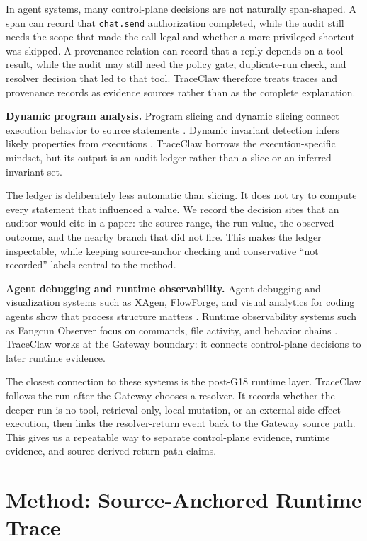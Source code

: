 \documentclass[11pt,a4paper]{article}
\begin{document}
In agent systems, many control-plane decisions are not naturally
span-shaped. A span can record that \texttt{chat.send} authorization
completed, while the audit still needs the scope that made the call legal
and whether a more privileged shortcut was skipped. A provenance relation
can record that a reply depends on a tool result, while the audit may
still need the policy gate, duplicate-run check, and resolver decision
that led to that tool. TraceClaw therefore treats traces and provenance
records as evidence sources rather than as the complete explanation.

\textbf{Dynamic program analysis.}
Program slicing and dynamic slicing connect execution behavior to source
statements \cite{weiser1984,agrawalHorgan1990}. Dynamic invariant
detection infers likely properties from executions \cite{daikon2007}.
TraceClaw borrows the execution-specific mindset, but its output is an
audit ledger rather than a slice or an inferred invariant set.

The ledger is deliberately less automatic than slicing. It does not try
to compute every statement that influenced a value. We record the
decision sites that an auditor would cite in a paper: the source range,
the run value, the observed outcome, and the nearby branch that did not
fire. This makes the ledger inspectable, while keeping source-anchor
checking and conservative ``not recorded'' labels central to the method.

\textbf{Agent debugging and runtime observability.}
Agent debugging and visualization systems such as XAgen, FlowForge, and
visual analytics for coding agents show that process structure matters
\cite{xagen2026,wang2025illuminating,hao2025flowforge}. Runtime
observability systems such as Fangcun Observer focus on commands, file
activity, and behavior chains \cite{fangcunObserver}. TraceClaw works at
the Gateway boundary: it connects control-plane decisions to later
runtime evidence.

The closest connection to these systems is the post-G18 runtime layer.
TraceClaw follows the run after the Gateway chooses a resolver. It
records whether the deeper run is no-tool, retrieval-only,
local-mutation, or an external side-effect execution, then links the
resolver-return event back to the Gateway source path. This gives us a
repeatable way to separate control-plane evidence, runtime evidence, and
source-derived return-path claims.

\section{Method: Source-Anchored Runtime Trace}
\label{sec:method}
\end{document}
